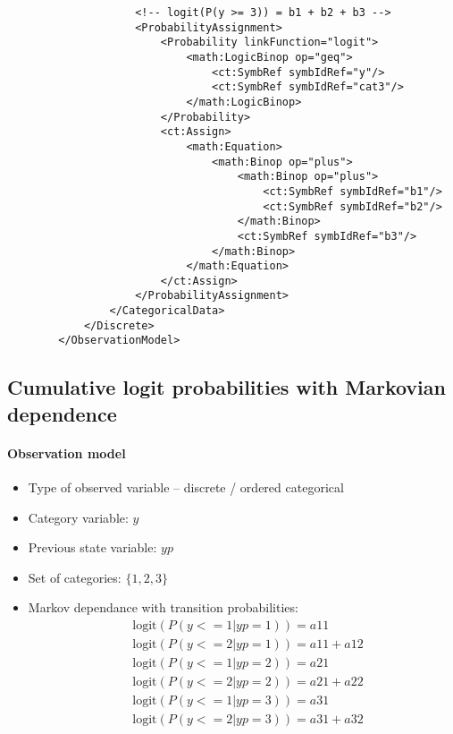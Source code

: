 \begin{lstlisting}
                    <!-- logit(P(y >= 3)) = b1 + b2 + b3 --> 
                    <ProbabilityAssignment>
                        <Probability linkFunction="logit">
                            <math:LogicBinop op="geq">
                                <ct:SymbRef symbIdRef="y"/>
                                <ct:SymbRef symbIdRef="cat3"/>
                            </math:LogicBinop>
                        </Probability>
                        <ct:Assign>
                            <math:Equation>
                                <math:Binop op="plus">
                                    <math:Binop op="plus">
                                        <ct:SymbRef symbIdRef="b1"/>
                                        <ct:SymbRef symbIdRef="b2"/>
                                    </math:Binop>
                                    <ct:SymbRef symbIdRef="b3"/>
                                </math:Binop>
                            </math:Equation>
                        </ct:Assign>
                    </ProbabilityAssignment>
                </CategoricalData>
            </Discrete>
        </ObservationModel>
\end{lstlisting}


\subsection{Cumulative logit probabilities with Markovian dependence}

\paragraph{Observation model}

\begin{itemize}
\item
Type of observed variable -- discrete / ordered categorical
\item
Category variable: $y$
\item
Previous state variable: $yp$
\item
Set of categories: $\{1,2,3\}$
\item
Markov dependance with transition probabilities:
\begin{align}
& \text{logit}(P(y<=1 | yp=1)) = a11 \nonumber \\
& \text{logit}(P(y<=2 | yp=1)) = a11 + a12\nonumber \\
& \text{logit}(P(y<=1 | yp=2)) = a21\nonumber \\
& \text{logit}(P(y<=2 | yp=2)) = a21 + a22\nonumber \\
& \text{logit}(P(y<=1 | yp=3)) = a31\nonumber \\
& \text{logit}(P(y<=2 | yp=3)) = a31 + a32\nonumber 
\end{align}
\end{itemize}


